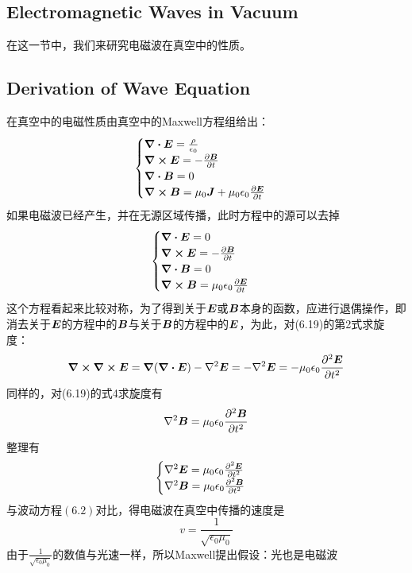\documentclass[14pt,oneside]{book}
\def \E{\vb*{E}}
\def \B{\vb*{B}}
\begin{document}
\begin{large}
\section{Electromagnetic Waves in Vacuum}
在这一节中，我们来研究电磁波在真空中的性质。
\subsection{Derivation of Wave Equation}
在真空中的电磁性质由真空中的Maxwell方程组给出：
\begin{align}
        \begin{cases}
                \div{\vb*{E}}=\frac{\rho}{\epsilon_0}\\
                \curl{\vb*{E}}=-\pdv{\vb*{B}}{t} \\
                \div{\vb*{B}}=0\\
                \curl{\vb*{B}}=\mu_0\vb*{J}+\mu_0\epsilon_0\pdv{\vb*{E}}{t}& 
        \end{cases}
\end{align}
如果电磁波已经产生，并在无源区域传播，此时方程中的源可以去掉
\begin{align}
        \begin{cases}
                \div{\vb*{E}}=0\\
                \curl{\vb*{E}}=-\pdv{\vb*{B}}{t} \\
                \div{\vb*{B}}=0\\
                \curl{\vb*{B}}=\mu_0\epsilon_0\pdv{\vb*{E}}{t}& 
        \end{cases}
\end{align}
这个方程看起来比较对称，为了得到关于$\vb*{E}$或$\B$本身的函数，应进行退偶操作，即消去关于$\E$的方程中的$\B$与关于$\B$的方程中的$\E$，为此，对(6.19)的第2式求旋度：
\begin{equation}
  \curl{\curl{\E}}=\grad(\div{\E})-\nabla^2\E=-\nabla^2\E=-\mu_0\epsilon_0\pdv[2]{\E}{t}
\end{equation}
同样的，对(6.19)的式4求旋度有
\begin{equation}
  \nabla^2\B=\mu_0\epsilon_0\pdv[2]{\B}{t}
\end{equation}
整理有
\begin{align}
\begin{cases}
	\nabla^2\E=\mu_0\epsilon_0\pdv[2]{\E}{t}\\
	\nabla^2\B=\mu_0\epsilon_0\pdv[2]{\B}{t}
\end{cases}
\end{align}
与波动方程$(6.2)$对比，得电磁波在真空中传播的速度是
\begin{equation}
  v=\frac{1}{\sqrt{{\epsilon_0\mu_0}}}
\end{equation}
由于$\frac{1}{\sqrt{\epsilon_0\mu_0}}$的数值与光速一样，所以Maxwell提出假设：光也是电磁波

\end{large}
\end{document}
